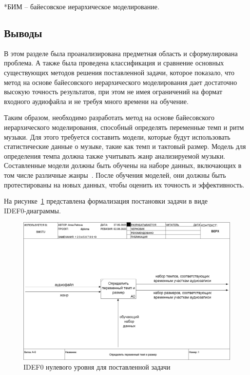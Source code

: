 \newpage

*БИМ -- байесовское иерархическое моделирование.

\subsection*{Выводы}

В этом разделе была проанализирована предметная область и сформулирована проблема. А также была проведена классификация и сравнение основных существующих методов решения поставленной задачи, которое показало, что метод на основе байесовского иерархического моделирования дает достаточно высокую точность результатов, при этом не имея ограничений на формат входного аудиофайла и не требуя много времени на обучение.

Таким образом, необходимо разработать метод на основе байесовского иерархического моделирования, способный определять переменные темп и ритм музыки. Для этого требуется составить модели, которые будут использовать статистические данные о музыке, такие как темп и тактовый размер. Модель для определения темпа должна также учитывать жанр анализируемой музыки. Составленные модели должны быть обучены на наборе данных, включающих в том числе различные жанры~\cite{dataset}. После обучения моделей, они должны быть протестированы на новых данных, чтобы оценить их точность и эффективность.

На рисунке~\ref{img:idef_0} представлена формализация постановки задачи в виде\\ IDEF0-диаграммы.

\begin{figure}[h]
	\centering
	\includegraphics[scale=0.3]{inc/img/idef_analit.png}
	\caption{IDEF0 нулевого уровня для поставленной задачи}
	\label{img:idef_0}
\end{figure}


